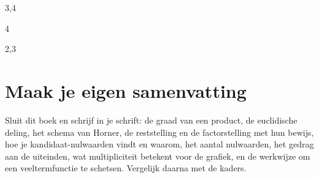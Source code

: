 \begin{oefeningen}
\begin{alleenvoor}{3,4}
\end{alleenvoor}
\begin{alleenvoor}{4}

\end{alleenvoor}

\end{oefeningen}


\begin{oefeningen}





\begin{alleenvoor}{2,3}

\end{alleenvoor}
\end{oefeningen}


\ifzelfstudie
\section*{Maak je eigen samenvatting}
Sluit dit boek en schrijf in je schrift: de graad van een product, de euclidische deling, het schema van Horner, de reststelling en de factorstelling met hun bewijs, hoe je kandidaat-nulwaarden vindt en waarom, het aantal nulwaarden, het gedrag aan de uiteinden, wat multipliciteit betekent voor de grafiek, en de werkwijze om een veeltermfunctie te schetsen. Vergelijk daarna met de kaders.
\fi
